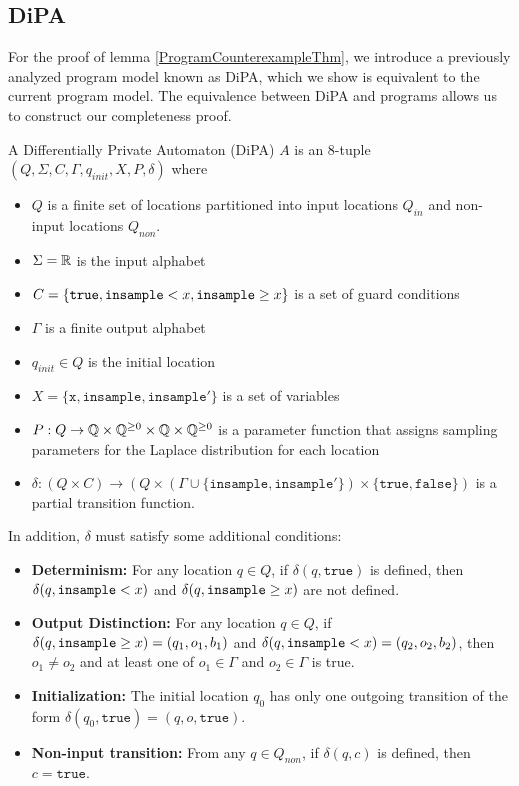 \subsection{DiPA}

For the proof of lemma \ref{ProgramCounterexampleThm}, we introduce a previously analyzed program model known as DiPA, which we show is equivalent to the current program model. The equivalence between DiPA and programs allows us to construct our completeness proof. 

\begin{defn}
    A Differentially Private Automaton (DiPA) $A$ is an 8-tuple $(Q, \Sigma, C, \Gamma, q_{init}, X, P, \delta)$ where
    \begin{itemize}
        \item $Q$ is a finite set of locations partitioned into input locations $Q_{in}$ and non-input locations $Q_{non}$. 
        \item $\Sigma = \mathbb{R}$ is the input alphabet
        \item $C = \{\texttt{true}, \texttt{insample} < x, \texttt{insample}\geq x\}$ is a set of guard conditions
        \item $\Gamma$ is a finite output alphabet
        \item $q_{init}\in Q$ is the initial location
        \item $X = \{\texttt{x}, \texttt{insample}, \texttt{insample}'\}$ is a set of variables
        \item $P: Q\to \mathbb{Q}\times \mathbb{Q}^{\geq 0}\times \mathbb{Q}\times  \mathbb{Q}^{\geq 0}$ is a parameter function that assigns sampling parameters for the Laplace distribution for each location
        \item $\delta:(Q\times C)\to (Q\times (\Gamma \cup \{\texttt{insample}, \texttt{insample}'\})\times \{\texttt{true}, \texttt{false}\})$ is a partial transition function. 
    \end{itemize}
    In addition, $\delta$ must satisfy some additional conditions:
    \begin{itemize}
        \item \textbf{Determinism:} For any location $q\in Q$, if $\delta(q,\texttt{true})$ is defined, then $\delta(q,\texttt{insample} < x)$ and $\delta(q,\texttt{insample}\geq x)$ are not defined. 

        \item \textbf{Output Distinction:} For any location $q\in Q$, if $\delta(q, \texttt{insample}\geq x) = (q_1, o_1, b_1)$ and $\delta(q, \texttt{insample} < x) = (q_2, o_2, b_2)$, then $o_1\neq o_2$ and at least one of $o_1\in \Gamma$ and $o_2\in \Gamma$ is true.

        \item \textbf{Initialization:} The initial location $q_0$ has only one outgoing transition of the form $\delta(q_0, \texttt{true}) = (q, o, \texttt{true})$.

        \item \textbf{Non-input transition:} From any $q\in Q_{non}$, if $\delta(q, c)$ is defined, then $c=\texttt{true}$.
    \end{itemize}
\end{defn}

